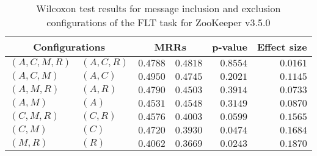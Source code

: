 
\begin{table}
\begin{spacing}{1.2}
\centering
\caption{Wilcoxon test results for message inclusion and exclusion configurations of the FLT task for ZooKeeper v3.5.0}
\label{table:versus-wilcox-zookeeper-flt-message}
\begin{tabular}{ll|rr|rr}
\toprule
      \multicolumn{2}{c|}{Configurations} &          \multicolumn{2}{c|}{MRRs} &       p-value & Effect size \\
\midrule
 $(A,C,M,R)$ &  $(A,C,R)$ & $0.4788$ & $0.4818$ & $0.8554$ &    $0.0161$ \\
   $(A,C,M)$ &    $(A,C)$ & $0.4950$ & $0.4745$ & $0.2021$ &    $0.1145$ \\
   $(A,M,R)$ &    $(A,R)$ & $0.4790$ & $0.4503$ & $0.3914$ &    $0.0733$ \\
     $(A,M)$ &      $(A)$ & $0.4531$ & $0.4548$ & $0.3149$ &    $0.0870$ \\
   $(C,M,R)$ &    $(C,R)$ & $0.4576$ & $0.4003$ & $0.0599$ &    $0.1565$ \\
     $(C,M)$ &      $(C)$ & $0.4720$ & $0.3930$ & $0.0474$ &    $0.1684$ \\
     $(M,R)$ &      $(R)$ & $0.4062$ & $0.3669$ & $0.0243$ &    $0.1870$ \\
\bottomrule
\end{tabular}

\end{spacing}
\end{table}

